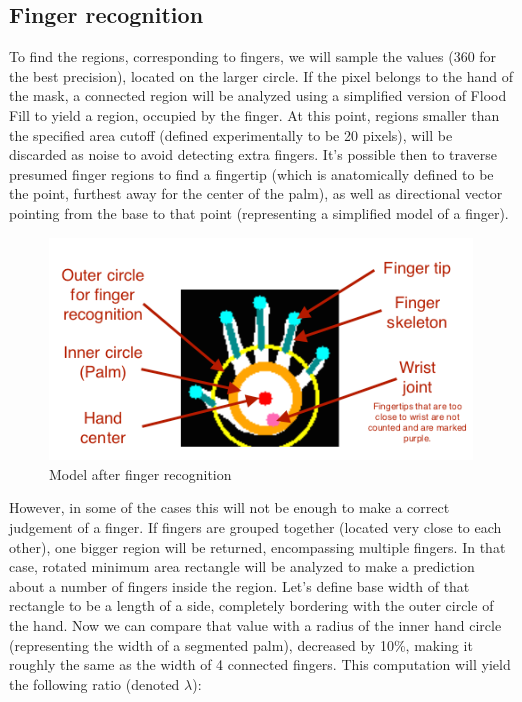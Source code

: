 \documentclass[a4paper,11pt,oneside]{article}
\begin{document}
\subsection{Finger recognition}

To find the regions, corresponding to fingers, we will sample the values (360 for the best precision), located on the larger circle. If the pixel belongs to the hand of the mask, a connected region will be analyzed using a simplified version of Flood Fill to yield a region, occupied by the finger. At this point, regions smaller than the specified area cutoff (defined experimentally to be 20 pixels), will be discarded as noise to avoid detecting extra fingers. It's possible then to traverse presumed finger regions to find a fingertip (which is anatomically defined to be the point, furthest away for the center of the palm), as well as directional vector pointing from the base to that point (representing a simplified model of a finger).\\

 \begin{figure}[H]
  \centering
  \includegraphics[scale=1.4]{hand-recognized.png}
  \caption{Model after finger recognition}
  \end{figure}

However, in some of the cases this will not be enough to make a correct judgement of a finger. If fingers are grouped together (located very close to each other), one bigger region will be returned, encompassing multiple fingers. In that case, rotated minimum area rectangle will be analyzed to make a prediction about a number of fingers inside the region. Let's define base width of that rectangle to be a length of a side, completely bordering with the outer circle of the hand. Now we can compare that value with a radius of the inner hand circle (representing the width of a segmented palm), decreased by 10\%, making it roughly the same as the width of 4 connected fingers. This computation will yield the following ratio (denoted $\lambda$):
\end{document}
